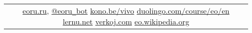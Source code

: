 \documentclass{article}
\begin{document}
\begin{center}
\begin{tabular}{l}
\multicolumn{1}{c}{
\href{http://eoru.ru/}{eoru.ru}, \href{https://t.me/eoru_bot}{@eoru\texttt{\_}bot}
\quad \href{https://kono.be/vivo}{kono.be/vivo}
\quad \href{https://duolingo.com/course/eo/en}{duolingo.com/course/eo/en}
\quad \href{https://lernu.net/}{lernu.net}
\quad \href{https://verkoj.com/}{verkoj.com}
\quad \href{https://eo.wikipedia.org/}{eo.wikipedia.org}
}
\\
\end{tabular}
\end{center}
\end{document}
